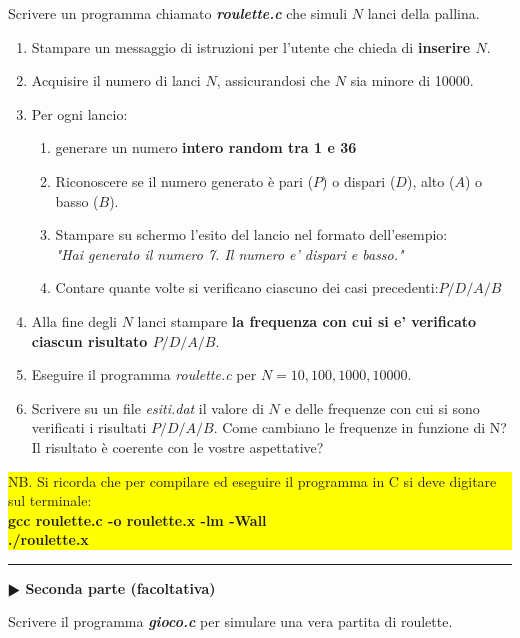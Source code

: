 \documentclass[12pt]{article}
\begin{document}
Scrivere un programma chiamato \textbf{\emph{roulette.c}} che simuli $N$ lanci della pallina.
\begin{enumerate}
\item Stampare un messaggio di istruzioni per l'utente che chieda di \textbf{inserire $N$}.
\item Acquisire il numero di lanci $N$, assicurandosi che $N$ sia minore di 10000.
\item Per ogni lancio:
\begin{enumerate}
\item generare un numero \textbf{intero random tra 1 e 36}
\item Riconoscere se il numero generato \`e pari ($P$) o dispari ($D$), alto ($A$) o basso ($B$).
\item Stampare su schermo l'esito del lancio nel formato dell'esempio:\\ \emph{"Hai generato il numero 7. Il numero e' dispari e basso."} 
\item Contare quante volte si verificano ciascuno dei casi precedenti:$P/D/A/B$
\end{enumerate}
\item Alla fine degli $N$ lanci stampare \textbf{la frequenza con cui si e' verificato ciascun risultato $P/D/A/B$}.
\item Eseguire il programma \emph{roulette.c} per $N=10,100, 1000, 10000$. \item Scrivere su un file \emph{esiti.dat} il valore di $N$ e delle frequenze con cui si sono verificati i risultati $P/D/A/B$. Come cambiano le frequenze in funzione di N? Il risultato \`e coerente con le vostre aspettative?
\end{enumerate}
\colorbox{yellow}{\begin{minipage}{17cm}
NB. Si ricorda che per compilare ed eseguire il programma in C si deve digitare sul terminale:\\
\textbf{gcc roulette.c -o roulette.x -lm -Wall \\
./roulette.x}
\end{minipage}}


\newpage
\hrule
\vspace{2mm}
\textbf{$\RHD$ Seconda parte (facoltativa)} 
\vspace{2mm}

Scrivere  il programma \textbf{\emph{gioco.c}} per simulare una vera partita di roulette. 
\end{document}
